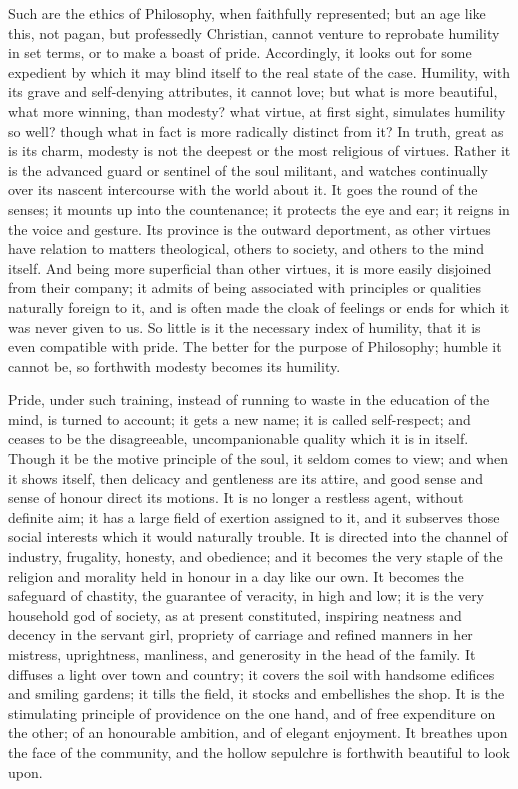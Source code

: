Such are the ethics of Philosophy, when faithfully represented; but
an age like this, not pagan, but professedly Christian, cannot venture
to reprobate humility in set terms, or to make a boast of pride.
Accordingly, it looks out for some expedient by which it may blind
itself to the real state of the case. Humility, with its grave and
self-denying attributes, it cannot love; but what is more beautiful,
what more winning, than modesty? what virtue, at first sight,
simulates humility so well? though what in fact is more radically
distinct from it? In truth, great as is its charm, modesty is not the
deepest or the most religious of virtues. Rather it is the advanced
guard or sentinel of the soul militant, and watches continually over
its nascent intercourse with the world about it. It goes the round of
the senses; it mounts up into the countenance; it protects the eye and
ear; it reigns in the voice and gesture. Its province is the outward
deportment, as other virtues have relation to matters theological,
others to society, and others to the mind itself. And being more
superficial than other virtues, it is more easily disjoined from their
company; it admits of being associated with principles or
qualities naturally foreign to it, and is often made the cloak of
feelings or ends for which it was never given to us. So little is it
the necessary index of humility, that it is even compatible with
pride. The better for the purpose of Philosophy; humble it cannot be,
so forthwith modesty becomes its humility.

Pride, under such training, instead of running to waste in the
education of the mind, is turned to account; it gets a new name; it is
called self-respect; and ceases to be the disagreeable,
uncompanionable quality which it is in itself. Though it be the motive
principle of the soul, it seldom comes to view; and when it shows
itself, then delicacy and gentleness are its attire, and good sense
and sense of honour direct its motions. It is no longer a restless
agent, without definite aim; it has a large field of exertion assigned
to it, and it subserves those social interests which it would
naturally trouble. It is directed into the channel of industry,
frugality, honesty, and obedience; and it becomes the very staple of
the religion and morality held in honour in a day like our own. It
becomes the safeguard of chastity, the guarantee of veracity, in high
and low; it is the very household god of society, as at present
constituted, inspiring neatness and decency in the servant girl,
propriety of carriage and refined manners in her mistress,
uprightness, manliness, and generosity in the head of the family. It
diffuses a light over town and country; it covers the soil with
handsome edifices and smiling gardens; it tills the field, it stocks
and embellishes the shop. It is the stimulating principle of
providence on the one hand, and of free expenditure on the other; of
an honourable ambition, and of elegant enjoyment. It breathes upon the
face of the community, and the hollow sepulchre is forthwith beautiful
to look upon.

